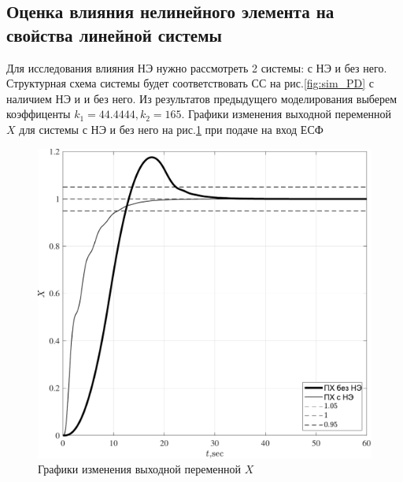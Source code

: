 \subsection{Оценка влияния нелинейного элемента на свойства линейной системы}
Для исследования влияния НЭ нужно рассмотреть 2 системы: с НЭ и без него.
Структурная схема системы будет соответствовать СС на рис.\ref{fig:sim_PD} с наличием НЭ и и без него.
Из результатов предыдущего моделирования выберем коэффиценты $k_1=44.4444,k_2=165$. 
 Графики изменения выходной переменной $X$ для системы с НЭ и без него на рис.\ref{fig:NE_influence_sys} 
при подаче на вход ЕСФ
\begin{figure}[!h]\centering
\includegraphics[width=1.0\linewidth]{images/NE_influence_sys}
\caption{ Графики изменения выходной переменной $X$}\label{fig:NE_influence_sys}
\end{figure}

